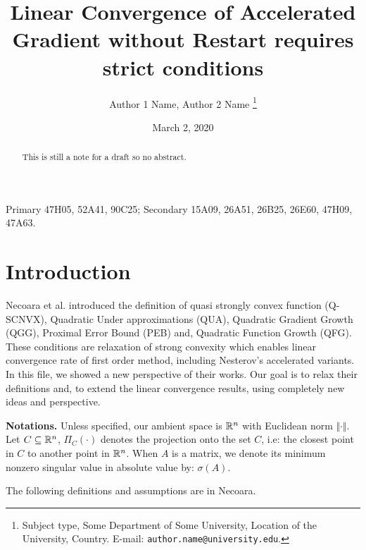 \documentclass[12pt]{article}
\begin{document}
\newcommand{\dist}{\ensuremath{\operatorname{dist}}}

\title{{\selectfont Linear Convergence of Accelerated Gradient without Restart requires strict conditions}}

\author{
    Author 1 Name, Author 2 Name
    \thanks{
        Subject type, Some Department of Some University, Location of the University,
        Country. E-mail: \texttt{author.name@university.edu}.
    }
}

\date{March 2, 2020}

\maketitle
{}

\begin{abstract} 
    \noindent
    This is still a note for a draft so no abstract. 
\end{abstract}

Primary 47H05, 52A41, 90C25; Secondary 15A09, 26A51, 26B25, 26E60, 47H09, 47A63.


\section{Introduction}
    Necoara et al. \cite{necoara_linear_2019}  introduced the definition of quasi strongly convex function (Q-SCNVX), Quadratic Under approximations (QUA), Quadratic Gradient Growth (QGG), Proximal Error Bound (PEB) and, Quadratic Function Growth (QFG). 
    These conditions are relaxation of strong convexity which enables linear convergence rate of first order method, including Nesterov's accelerated variants. 
    In this file, we showed a new perspective of their works. 
    Our goal is to relax their definitions and, to extend the linear convergence results, using completely new ideas and perspective. 
    \par
    \textbf{Notations.}
    Unless specified, our ambient space is $\mathbb R^n$ with Euclidean norm $\Vert \cdot\Vert$.
    Let $C\subseteq \mathbb R^n$, $\Pi_C(\cdot)$ denotes the projection onto the set $C$, i.e: the closest point in $C$ to another point in $\mathbb R^n$. 
    When $A$ is a matrix, we denote its minimum nonzero singular value in absolute value by: $\sigma(A)$. 
    \par
    The following definitions and assumptions are in Necoara. 
    
\end{document}
